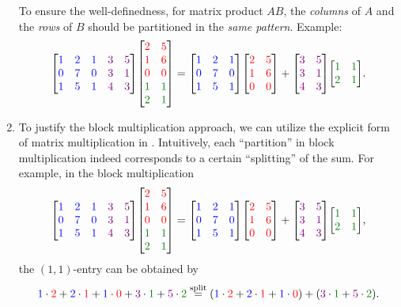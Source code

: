 \begin{enumerate}
To ensure the well-definedness, for matrix product \(AB\), the \emph{columns}
of \(A\) and the \emph{rows} of \(B\) should be partitioned in the \emph{same
pattern}. Example:
\[
\mqty[
\blc{1}&\blc{2}&\blc{1}&\vc{3}&\vc{5}\\
\blc{0}&\blc{7}&\blc{0}&\vc{3}&\vc{1}\\
\blc{1}&\blc{5}&\blc{1}&\vc{4}&\vc{3}\\
]
\mqty[
\rc{2}&\rc{5}\\
\rc{1}&\rc{6}\\
\rc{0}&\rc{0}\\
\gc{1}&\gc{1}\\
\gc{2}&\gc{1}
]
=
\mqty[
\blc{1}&\blc{2}&\blc{1}\\
\blc{0}&\blc{7}&\blc{0}\\
\blc{1}&\blc{5}&\blc{1}\\]
\mqty[
\rc{2}&\rc{5}\\
\rc{1}&\rc{6}\\
\rc{0}&\rc{0}\\]
+\mqty[
\vc{3}&\vc{5}\\
\vc{3}&\vc{1}\\
\vc{4}&\vc{3}\\]
\mqty[\gc{1}&\gc{1}\\
\gc{2}&\gc{1}\\].
\]
\item To justify the block multiplication approach, we can utilize the explicit
form of matrix multiplication in .
Intuitively, each ``partition'' in block multiplication indeed corresponds to
a certain ``splitting'' of the sum. For example, in the block multiplication
\[
\mqty[
\blc{1}&\blc{2}&\blc{1}&\vc{3}&\vc{5}\\
\blc{0}&\blc{7}&\blc{0}&\vc{3}&\vc{1}\\
\blc{1}&\blc{5}&\blc{1}&\vc{4}&\vc{3}\\
]
\mqty[
\rc{2}&\rc{5}\\
\rc{1}&\rc{6}\\
\rc{0}&\rc{0}\\
\gc{1}&\gc{1}\\
\gc{2}&\gc{1}
]
=
\mqty[
\blc{1}&\blc{2}&\blc{1}\\
\blc{0}&\blc{7}&\blc{0}\\
\blc{1}&\blc{5}&\blc{1}\\]
\mqty[
\rc{2}&\rc{5}\\
\rc{1}&\rc{6}\\
\rc{0}&\rc{0}\\]
+\mqty[
\vc{3}&\vc{5}\\
\vc{3}&\vc{1}\\
\vc{4}&\vc{3}\\]
\mqty[\gc{1}&\gc{1}\\
\gc{2}&\gc{1}\\],
\]
the \((1,1)\)-entry can be obtained by
\[
\blc{1}\cdot\rc{2}+\blc{2}\cdot\rc{1}+\blc{1}\cdot\rc{0}
+\vc{3}\cdot \gc{1}+\vc{5}\cdot \gc{2}
\overset{\text{split}}{=}(\blc{1}\cdot\rc{2}+\blc{2}\cdot\rc{1}+\blc{1}\cdot\rc{0})
+(\vc{3}\cdot \gc{1}+\vc{5}\cdot \gc{2}).
\]


\end{enumerate}
